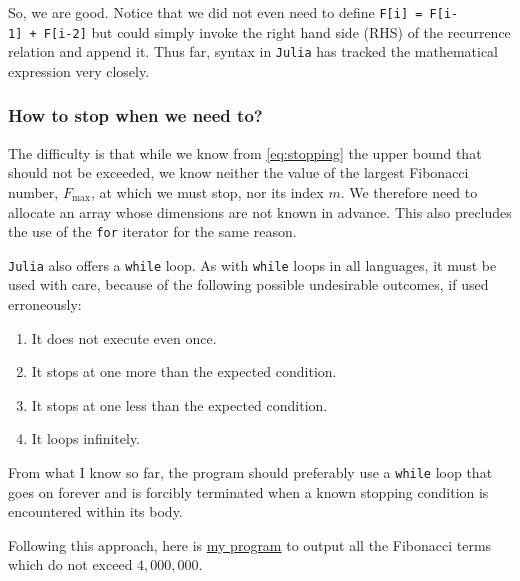 \documentclass[
  a4paper,
]{article}
\providecommand{\tightlist}{%
  \setlength{\itemsep}{0pt}\setlength{\parskip}{0pt}}
\begin{document}
So, we are good. Notice that we did not even need to define
\texttt{F{[}i{]}\ =\ F{[}i-1{]}\ +\ F{[}i-2{]}} but could simply invoke
the right hand side (RHS) of the recurrence relation and append it. Thus
far, syntax in \texttt{Julia} has tracked the mathematical expression
very closely.

\hypertarget{how-to-stop-when-we-need-to}{%
\subsubsection{How to stop when we need
to?}\label{how-to-stop-when-we-need-to}}

The difficulty is that while we know from \cref{eq:stopping} the upper
bound that should not be exceeded, we know neither the value of the
largest Fibonacci number, \(F_{\max}\), at which we must stop, nor its
index \(m\). We therefore need to allocate an array whose dimensions are
not known in advance. This also precludes the use of the \texttt{for}
iterator for the same reason.

\texttt{Julia} also offers a \texttt{while} loop. As with \texttt{while}
loops in all languages, it must be used with care, because of the
following possible undesirable outcomes, if used erroneously:

\begin{enumerate}
\def\labelenumi{\alph{enumi}.}
\tightlist
\item
  It does not execute even once.
\item
  It stops at one more than the expected condition.
\item
  It stops at one less than the expected condition.
\item
  It loops infinitely.
\end{enumerate}

From what I know so far, the program should preferably use a
\texttt{while} loop that goes on forever and is forcibly terminated when
a known stopping condition is encountered within its body.

Following this approach, here is \href{auxiliary/until-4m.jl}{my
program} to output all the Fibonacci terms which do not exceed
\(4,000,000\).
\end{document}
